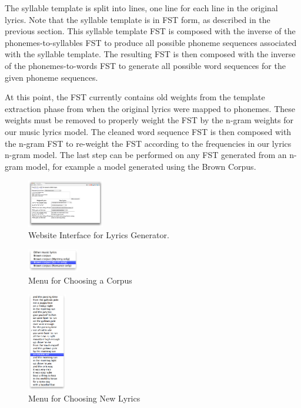 \documentclass{vgtc}                          %
\begin{document}
The syllable template
is split into lines, one line for each line in the original
lyrics. Note that the syllable template is in FST form, as
described in the previous section. This syllable template
FST is composed with the inverse of the phonemes-to-syllables
FST to produce all possible phoneme sequences associated
with the syllable template. The resulting FST is then
composed with the inverse of the phonemes-to-words FST
to generate all possible word sequences for the given
phoneme sequences.

At this point, the FST currently contains
old weights from the template extraction phase from when
the original lyrics were mapped to phonemes. These weights
must be removed to properly weight the FST by the n-gram
weights for our music lyrics model. The cleaned word sequence FST
is then composed with the n-gram FST to re-weight
the FST according to the frequencies in our lyrics n-gram model.
The last step can be performed on any FST generated from an n-gram
model, for example a model generated using the Brown Corpus.

\begin{figure}%
\centering
\includegraphics[width=0.3\textwidth]{images/png/lion_king2.png}
\caption{Website Interface for Lyrics Generator.}
\label{fig:interface}
\end{figure}

\begin{figure}%
\centering
\includegraphics[width=0.2\textwidth]{images/png/choose_corpus.png}
\caption{Menu for Choosing a Corpus}
\label{fig:corpus-menu}
\end{figure}

\begin{figure}%
\centering
\includegraphics[width=0.15\textwidth]{images/png/choose_lyrics_menu.png}
\caption{Menu for Choosing New Lyrics}
\label{fig:lyrics-menu}
\end{figure}
\end{document}
